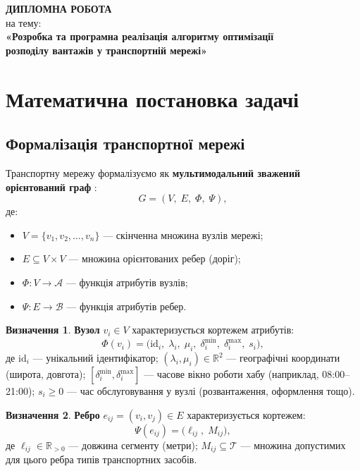 \documentclass[14pt,a4paper]{extarticle}
\theoremstyle{definition}
\newtheorem{definition}{Визначення}[section]
\theoremstyle{plain}
\newcommand{\vset}[1]{\mathcal{#1}}
\newcommand{\Real}{\mathbb{R}}
\begin{document}
\begin{center}
    {\large\bfseries ДИПЛОМНА РОБОТА}\\[4pt]
    {\normalsize на тему:}\\[6pt]
    {\large\bfseries «Розробка та програмна реалізація алгоритму оптимізації\\
    розподілу вантажів у транспортній мережі»}\\[12pt]
\end{center}

\vspace{1.5cm}

\section{Математична постановка задачі}\label{sec:formulation}

\subsection{Формалізація транспортної мережі}

Транспортну мережу формалізуємо як \textbf{мультимодальний зважений орієнтований граф} \cite{toth2014}:
\[
    G = (V,\; E,\; \Phi,\; \Psi),
\]
де:
\begin{itemize}[leftmargin=2em]
    \item $V = \{v_1, v_2, \ldots, v_n\}$ --- скінченна множина вузлів мережі;
    \item $E \subseteq V \times V$ --- множина орієнтованих ребер (доріг);
    \item $\Phi : V \to \vset{A}$ --- функція атрибутів вузлів;
    \item $\Psi : E \to \vset{B}$ --- функція атрибутів ребер.
\end{itemize}

\begin{definition}
\textbf{Вузол} $v_i \in V$ характеризується кортежем атрибутів:
\[
    \Phi(v_i) = \bigl(\mathrm{id}_i,\; \lambda_i,\; \mu_i,\; \delta_i^{\min},\; \delta_i^{\max},\; s_i\bigr),
\]
де $\mathrm{id}_i$ --- унікальний ідентифікатор; $(\lambda_i, \mu_i) \in \Real^2$ --- географічні координати (широта, довгота); $[\delta_i^{\min}, \delta_i^{\max}]$ --- часове вікно роботи хабу (наприклад, 08:00--21:00); $s_i \geq 0$ --- час обслуговування у вузлі (розвантаження, оформлення тощо).
\end{definition}

\begin{definition}
\textbf{Ребро} $e_{ij} = (v_i, v_j) \in E$ характеризується кортежем:
\[
    \Psi(e_{ij}) = \bigl(\ell_{ij},\; M_{ij}\bigr),
\]
де $\ell_{ij} \in \Real_{>0}$ --- довжина сегменту (метри); $M_{ij} \subseteq \mathcal{T}$ --- множина допустимих для цього ребра типів транспортних засобів.
\end{definition}
\end{document}
